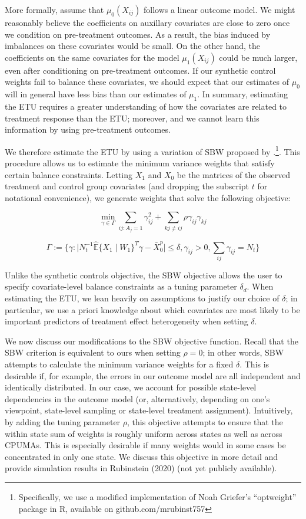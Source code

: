 \documentclass[12pt]{article}
\begin{document}
More formally, assume that $\mu_0(X_{ij})$ follows a linear outcome model. We might reasonably believe the coefficients on auxillary covariates are close to zero once we condition on pre-treatment outcomes. As a result, the bias induced by imbalances on these covariates would be small. On the other hand, the coefficients on the same covariates for the model $\mu_1(X_{ij})$ could be much larger, even after conditioning on pre-treatment outcomes. If our synthetic control weights fail to balance these covariates, we should expect that our estimates of $\mu_0$ will in general have less bias than our estimates of $\mu_1$. In summary, estimating the ETU requires a greater understanding of how the covariates are related to treatment response than the ETU; moreover, and we cannot learn this information by using pre-treatment outcomes.

We therefore estimate the ETU by using a variation of SBW proposed by \cite{zubizarreta2015stable}.\footnote{Specifically, we use a modified implementation of Noah Griefer's ``optweight'' package in R, available on github.com/mrubinst757}. This procedure allows us to estimate the minimum variance weights that satisfy certain balance constraints. Letting $X_1$ and $X_0$ be the matrices of the observed treatment and control group covariates (and dropping the subscript $t$ for notational convenience), we generate weights that solve the following objective:

$$
\min_{\gamma \in \Gamma} \sum_{ij: A_j = 1} \gamma_{ij}^2 + \sum_{kj \ne ij}\rho \gamma_{ij}\gamma_{kj}
$$

$$
\Gamma := \{\gamma: \mid N_t^{-1}\hat{\mathbb{E}}\{X_1 \mid W_1\}^T\gamma - \bar{X}_0^p \mid \le \delta, \gamma_{ij} > 0, \sum_{ij}\gamma_{ij} = N_t\}
$$

Unlike the synthetic controls objective, the SBW objective allows the user to specify covariate-level balance constraints as a tuning parameter $\delta_d$. When estimating the ETU, we lean heavily on assumptions to justify our choice of $\delta$; in particular, we use a priori knowledge about which covariates are most likely to be important predictors of treatment effect heterogeneity when setting $\delta$. 

We now discuss our modifications to the SBW objective function. Recall that the SBW criterion is equivalent to ours when setting $\rho = 0$; in other words, SBW attempts to calculate the minimum variance weights for a fixed $\delta$. This is desirable if, for example, the errors in our outcome model are all independent and identically distributed. In our case, we account for possible state-level dependencies in the outcome model (or, alternatively, depending on one's viewpoint, state-level sampling or state-level treatment assignment). Intuitively, by adding the tuning parameter $\rho$, this objective attempts to ensure that the within state sum of weights is roughly uniform across states as well as across CPUMAs. This is especially desirable if many weights would in some cases be concentrated in only one state. We discuss this objective in more detail and provide simulation results in Rubinstein (2020) (not yet publicly available).
\end{document}
